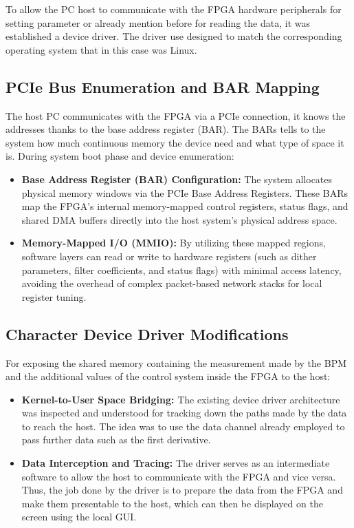 To allow the PC host to communicate with the FPGA hardware peripherals for setting parameter or already mention before for reading the data, it was established a device driver.
The driver use designed to match the corresponding operating system that in this case was Linux. 

\subsection{PCIe Bus Enumeration and BAR Mapping}
The host PC communicates with the FPGA via a PCIe connection, it knows the addresses thanks to the base address register (BAR).
The BARs tells to the system how much continuous memory the device need and what type of space it is.
During system boot phase and device enumeration:
\begin{itemize}
    \item \textbf{Base Address Register (BAR) Configuration:} The system allocates physical memory windows via the PCIe Base Address Registers. These BARs map the FPGA's internal memory-mapped control registers, status flags, and shared DMA buffers directly into the host system's physical address space.
    \item \textbf{Memory-Mapped I/O (MMIO):} By utilizing these mapped regions, software layers can read or write to hardware registers (such as dither parameters, filter coefficients, and status flags) with minimal access latency, avoiding the overhead of complex packet-based network stacks for local register tuning.
\end{itemize}

\subsection{Character Device Driver Modifications}
For exposing the shared memory containing the measurement made by the BPM and the additional values of the control system inside the FPGA to the host:
\begin{itemize}
    \item \textbf{Kernel-to-User Space Bridging:} The existing device driver architecture was inspected and understood for tracking down the paths made by the data to reach the host. The idea was to use the data channel already employed to pass further data such as the first derivative. 
    \item \textbf{Data Interception and Tracing:} The driver serves as an intermediate software to allow the host to communicate with the FPGA and vice versa. Thus, the job done by the driver is to prepare the data from the FPGA and make them presentable to the host, which can then be displayed on the screen using the local GUI.
\end{itemize}

